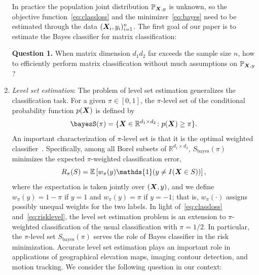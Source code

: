 \documentclass[12pt]{article}
\begin{document}
\begin{enumerate}[label={2.\arabic*},wide, labelwidth=!, labelindent=0pt]
In practice the population joint distribution $\mathbb{P}_{\bm X,y}$ is unknown, so the objective function~\eqref{eq:classloss} and the minimizer~\eqref{eq:bayes} need to be estimated through the data $(\bm X_i,y_i)_{i=1}^n$. The first goal of our paper is to estimate the Bayes classifier for matrix classification:

{\bf Question 1.} When matrix dimension $d_1d_2$ far exceeds the sample size $n$, how to efficiently perform matrix classification without much assumptions on $\mathbb{P}_{\bm X,y}$?



\item {\it Level set estimation}: The problem of level set estimation generalizes the classification task. 
For a given $\pi\in[0, 1]$, the $\pi$-level set of the conditional probability function $p(\bm X)$ is defined by
\begin{equation}\label{eq:level}
\bayesS(\pi) = \{\mX\in\mathbb{R}^{d_1\times d_2}\colon p(\mX)\geq \pi\}.
\end{equation}
An important characterization of $\pi$-level set is that it is the optimal weighted classifier~\citep{willett2007minimax,scott2007regression,wang2008probability}. Specifically, among all Borel subsets of $\mathbb{R}^{d_1\times d_2}$, $S_{\text{bayes}}(\pi)$ minimizes the expected $\pi$-weighted classification error,
\begin{equation}\label{eq:risklevel}
R_\pi(S)=\mathbb{E}\left[ w_{\pi}(y)\mathds{1}(y\neq I(\mX\in S))\right],
\end{equation}
where the expectation is taken jointly over $(\bm X,y)$, and we define $w_{\pi}(y)=1-\pi$ if $y=1$ and $w_{\pi}(y)=\pi$ if $y=-1$; that is, $w_{\pi}(\cdot)$ assigns possibly unequal weights for the two labels. In light of~\eqref{eq:classloss} and~\eqref{eq:risklevel}, the level set estimation problem is an extension to $\pi$-weighted classification of the usual classification with $\pi=1/2$. In particular, the $\pi$-level set $S_{\text{bayes}}(\pi)$ serves the role of Bayes classifier in the risk minimization. Accurate level set estimation plays an important role in applications of geographical elevation maps, imaging contour detection, and motion tracking. We consider the following question in our context:


\end{enumerate}
\end{document}

